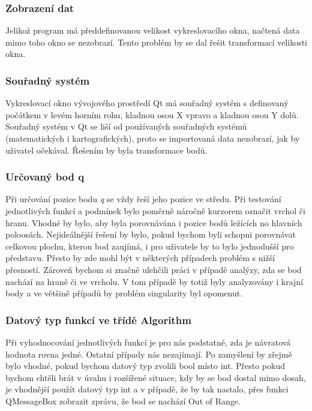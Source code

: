 \documentclass[a4paper, 12pt]{article}
\begin{document}
\subsubsection{Zobrazení dat}
Jelikož program má předdefinovanou velikost vykreslovacího okna, načtená data mimo toho okno se nezobrazí. Tento problém by se dal řešit transformací velikosti okna.

\subsubsection{Souřadný systém}
Vykreslovací okno vývojového prostředí Qt má souřadný systém s definovaný počátkem v levém horním rohu,  kladnou osou X vpravo a kladnou osou Y dolů. Souřadný systém v Qt se liší od používaných souřadných systémů (matematických i kartografických), proto se importovaná data nezobrazí, jak by uživatel očekával. Řešením by byla transformace bodů.

\subsubsection{Určovaný bod q}
Při určování pozice bodu \textit{q} se vždy řeší jeho pozice ve středu. Při testování jednotlivých funkcí a podmínek bylo poměrně náročně kurzorem označit vrchol či hranu. Vhodné by bylo, aby byla porovnávána i pozice bodů ležících no hlavních poloosách. Nejideálnější řešení by bylo, pokud bychom byli schopni porovnávat celkovou plochu, kterou bod zaujímá, i pro uživatele by to bylo jednodušší pro představu. Přesto by zde mohl být v některých případech problém s nižší přesností. Zároveň bychom si značně ulehčili práci v případě analýzy, zda se bod nachází na hraně či ve vrcholu. V tom případě by totiž byly analyzovány i krajní body a ve většině případů by problém singularity byl opomenut.

\subsubsection{Datový typ funkcí ve třídě Algorithm}
Při vyhodnocování jednotlivých funkcí je pro nás podstatné, zda je návratová hodnota rovna jedné. Ostatní případy nás nezajímají. Po zamyšlení by zřejmě bylo vhodné, pokud bychom datový typ zvolili bool místo int. Přesto pokud bychom chtěli brát v úvahu i rozšířené situace, kdy by se bod dostal mimo dosah, je vhodnější použít datový typ int a v případě, že by tak nastalo, přes funkci QMessageBox zobrazit zprávu, že bod se nachází Out of Range. 
\end{document}
